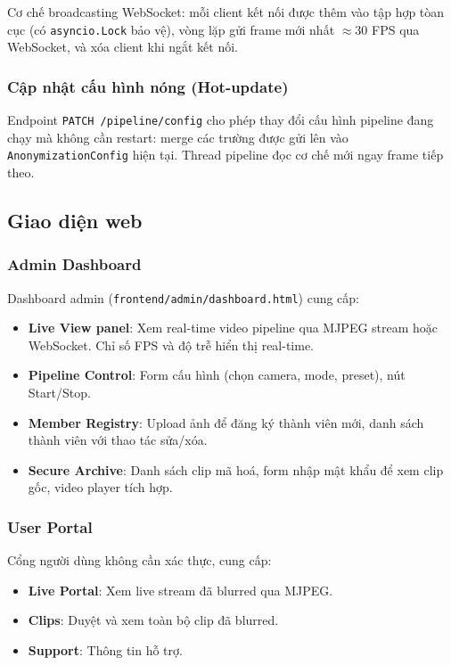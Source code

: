 Cơ chế broadcasting WebSocket: mỗi client kết nối được thêm vào tập hợp tòan cục (có \texttt{asyncio.Lock} bảo vệ), vòng lặp gửi frame mới nhất $\approx 30$ FPS qua WebSocket, và xóa client khi ngắt kết nối.

\subsubsection{Cập nhật cấu hình nóng (Hot-update)}

Endpoint \texttt{PATCH /pipeline/config} cho phép thay đổi cấu hình pipeline đang chạy mà không cần restart: merge các trường được gửi lên vào \texttt{AnonymizationConfig} hiện tại. Thread pipeline đọc cơ chế mới ngay frame tiếp theo.

\subsection{Giao diện web}
\label{subsec:giaodien}

\subsubsection{Admin Dashboard}

Dashboard admin (\texttt{frontend/admin/dashboard.html}) cung cấp:
\begin{itemize}
    \item \textbf{Live View panel}: Xem real-time video pipeline qua MJPEG stream hoặc WebSocket. Chỉ số FPS và độ trễ hiển thị real-time.
    \item \textbf{Pipeline Control}: Form cấu hình (chọn camera, mode, preset), nút Start/Stop.
    \item \textbf{Member Registry}: Upload ảnh để đăng ký thành viên mới, danh sách thành viên với thao tác sửa/xóa.
    \item \textbf{Secure Archive}: Danh sách clip mã hoá, form nhập mật khẩu để xem clip gốc, video player tích hợp.
\end{itemize}

\subsubsection{User Portal}

Cổng người dùng không cần xác thực, cung cấp:
\begin{itemize}
    \item \textbf{Live Portal}: Xem live stream đã blurred qua MJPEG.
    \item \textbf{Clips}: Duyệt và xem toàn bộ clip đã blurred.
    \item \textbf{Support}: Thông tin hỗ trợ.
\end{itemize}

